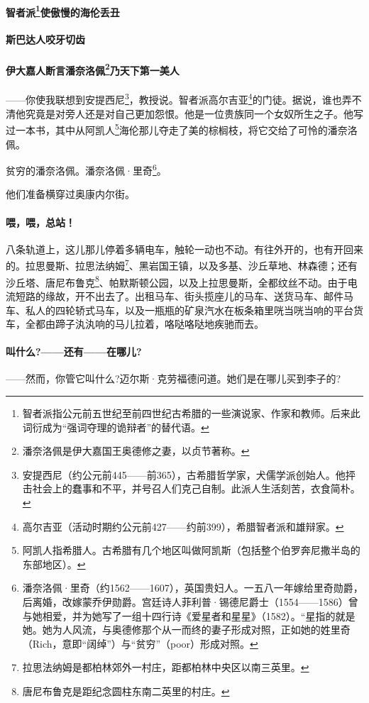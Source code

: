 \paragraph*{智者派\footnote{智者派指公元前五世纪至前四世纪古希腊的一些演说家、作家和教师。后来此词衍成为“强词夺理的诡辩者”的替代语。}使傲慢的海伦丢丑}
\paragraph*{斯巴达人咬牙切齿}
\paragraph*{伊大嘉人断言潘奈洛佩\footnote{潘奈洛佩是伊大嘉国王奥德修之妻，以贞节著称。}乃天下第一美人}
\par ——你使我联想到安提西尼\footnote{安提西尼（约公元前445——前365），古希腊哲学家，犬儒学派创始人。他抨击社会上的蠢事和不平，并号召人们克己自制。此派人生活刻苦，衣食简朴。}，教授说。智者派高尔吉亚\footnote{高尔吉亚（活动时期约公元前427——约前399），希腊智者派和雄辩家。}的门徒。据说，谁也弄不清他究竟是对旁人还是对自己更加怨恨。他是一位贵族同一个女奴所生之子。他写过一本书，其中从阿凯人\footnote{阿凯人指希腊人。古希腊有几个地区叫做阿凯斯（包括整个伯罗奔尼撒半岛的东部地区）。}海伦那儿夺走了美的棕榈枝，将它交给了可怜的潘奈洛佩。
\par 贫穷的潘奈洛佩。潘奈洛佩·里奇\footnote{潘奈洛佩·里奇（约1562——1607），英国贵妇人。一五八一年嫁给里奇勋爵，后离婚，改嫁蒙乔伊勋爵。宫廷诗人菲利普·锡德尼爵士（1554——1586）曾与她相爱，并为她写了一组十四行诗《爱星者和星星》（1582）。“星指的就是她。她为人风流，与奥德修那个从一而终的妻子形成对照，正如她的姓里奇（Rich，意即“阔绰”）与“贫穷”（poor）形成对照。}。
\par 他们准备横穿过奥康内尔街。
\paragraph*{喂，喂，总站！}
\par 八条轨道上，这儿那儿停着多辆电车，触轮一动也不动。有往外开的，也有开回来的。拉思曼斯、拉思法纳姆\footnote{拉思法纳姆是都柏林郊外一村庄，距都柏林中央区以南三英里。}、黑岩国王镇，以及多基、沙丘草地、林森德；还有沙丘塔、唐尼布鲁克\footnote{唐尼布鲁克是距纪念圆柱东南二英里的村庄。}、帕默斯顿公园，以及上拉思曼斯，全都纹丝不动。由于电流短路的缘故，开不出去了。出租马车、街头揽座儿的马车、送货马车、邮件马车、私人的四轮轿式马车，以及一瓶瓶的矿泉汽水在板条箱里咣当咣当响的平台货车，全都由蹄子汍汍响的马儿拉着，咯哒咯哒地疾驰而去。
\paragraph*{叫什么?——还有——在哪儿?}
\par ——然而，你管它叫什么?迈尔斯·克劳福德问道。她们是在哪儿买到李子的?
